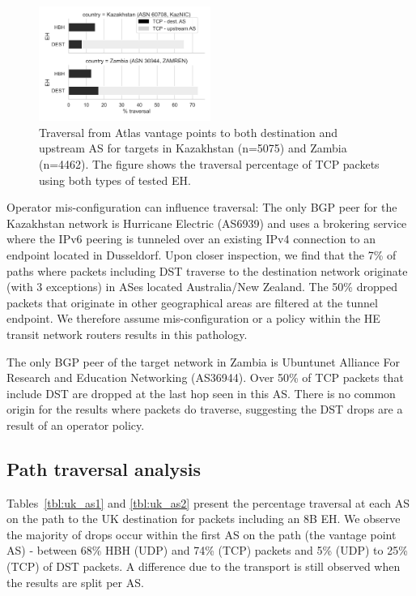 \documentclass[conference]{IEEEtran}
\begin{document}
\begin{figure}
\centering
  \includegraphics[width=0.5\textwidth]{traversal-pathologies.png}
  \caption{Traversal from Atlas vantage points to both destination and upstream AS for targets in Kazakhstan (n=5075) and Zambia (n=4462). The figure shows the traversal percentage of TCP packets using both types of tested EH.}
  \label{fig:traversal_pathologies}
\end{figure}

Operator mis-configuration can influence traversal: The only BGP peer for the Kazakhstan network is Hurricane Electric (AS6939) and uses a  brokering service where the IPv6 peering is tunneled over an existing IPv4 connection to an endpoint located in Dusseldorf. Upon closer inspection, we find that the 7\% of paths where packets including DST traverse to the destination network originate (with 3 exceptions) in ASes located Australia/New Zealand. The 50\% dropped packets that originate in other geographical areas are filtered at the tunnel endpoint. We therefore assume mis-configuration or a policy within the HE transit network routers results in this pathology. 


The only BGP peer of the target network in Zambia is Ubuntunet Alliance For Research and Education Networking (AS36944). Over 50\% of TCP packets that include DST are dropped at the last hop seen in this AS. There is no common origin for the results where packets do traverse, suggesting the DST drops are a result of an operator policy. 

\subsection{Path traversal analysis}

Tables~\ref{tbl:uk_as1} and \ref{tbl:uk_as2} present the percentage traversal at each AS on the path to the UK destination for packets including an 8B EH. We observe the majority of drops occur within the first AS on the path (the vantage point AS) - between 68\% HBH (UDP) and 74\% (TCP) packets and 5\% (UDP) to 25\% (TCP) of DST packets. A difference due to the transport is still observed when the results are split per AS. 
\end{document}
